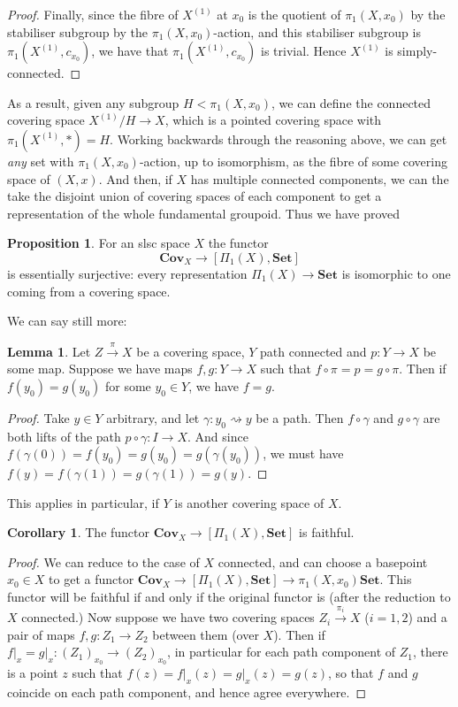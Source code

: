 \documentclass{tufte-handout}
\def\Set {\mathbf{Set}}
\def\Cov {\mathbf{Cov}}
\newcommand{\lecturenum}[1]{\marginnote{\color{red}Lecture #1}}
\theoremstyle{definition}
\newtheorem{prop}{Proposition}
\newtheorem{lemma}{Lemma}
\newtheorem{corollary}{Corollary}
\begin{document}
\begin{proof}
Finally, since the fibre of $X^{(1)}$ at $x_0$ is the quotient of $\pi_1(X,x_0)$ by the stabiliser subgroup by the $\pi_1(X,x_0)$-action, and this stabiliser subgroup is $\pi_1(X^{(1)},c_{x_0})$, we have that $\pi_1(X^{(1)},c_{x_0})$ is trivial. Hence $X^{(1)}$ is simply-connected.
\end{proof}

As a result, given any subgroup $H < \pi_1(X,x_0)$, we can define the connected covering space $X^{(1)}/H \to X$, which is a pointed covering space with $\pi_1(X^{(1)},\ast) = H$. Working backwards through the reasoning above, we can get \emph{any} set with $\pi_1(X,x_0)$-action, up to isomorphism, as the fibre of some covering space of $(X,x)$. And then, if $X$ has multiple connected components, we can the take the disjoint union of covering spaces of each component to get a representation of the whole fundamental groupoid. Thus we have proved

\begin{prop}
For an slsc space $X$ the functor
\[
	\Cov_X \to [\Pi_1(X),\Set]
\]
is essentially surjective: every representation $\Pi_1(X) \to \Set$ is isomorphic to one coming from a covering space.
\end{prop}

We\lecturenum{17} can say still more:

\begin{lemma}
Let $Z\xrightarrow{\pi} X$ be a covering space, $Y$ path connected and $p\colon Y\to X$ be some map. Suppose we have maps $f,g\colon Y\to X$ such that $f\circ \pi = p = g\circ \pi$. Then if $f(y_0) = g(y_0)$ for some $y_0\in Y$, we have $f=g$. 
\end{lemma}

\begin{proof}
Take $y\in Y$ arbitrary, and let $\gamma\colon y_0 \rightsquigarrow y$ be a path. Then $f\circ \gamma$ and $g\circ \gamma$ are both lifts of the path $p\circ \gamma\colon I \to X$. And since $f(\gamma(0)) = f(y_0) = g(y_0) = g(\gamma(y_0))$, we must have $f(y) = f(\gamma(1)) = g(\gamma(1)) = g(y)$. 
\end{proof}

This applies in particular, if $Y$ is another covering space of $X$.

\begin{corollary}
The functor $\Cov_{X} \to [\Pi_1(X),\Set]$ is faithful.
\end{corollary}

\begin{proof}
We can reduce to the case of $X$ connected, and can choose a basepoint $x_0\in X$ to get a functor $\Cov_X \to [\Pi_1(X),\Set] \to \pi_1(X,x_0)\Set$. This functor will be faithful if and only if the original functor is (after the reduction to $X$ connected.) Now suppose we have two covering spaces $Z_i \xrightarrow{\pi_i} X$ ($i=1,2$) and a pair of maps $f,g\colon Z_1 \to Z_2$ between them (over $X$). Then if $f\big|_x =g\big|_x\colon (Z_1)_{x_0} \to (Z_2)_{x_0}$, in particular for each path component of $Z_1$, there is a point $z$ such that $f(z) = f\big|_x(z) =g\big|_x(z) = g(z)$, so that $f$ and $g$ coincide on each path component, and hence agree everywhere.
\end{proof}
\end{document}
